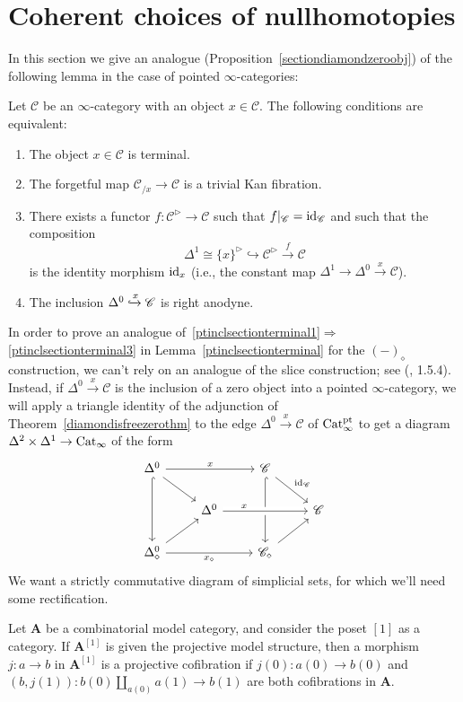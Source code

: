 \documentclass{tac}
\newcommand{\s}[1]{\mathscr{#1}}
\renewcommand{\bf}[1]{\mathbf{#1}}
\newcommand{\tx}[1]{\textnormal{#1}}
\begin{document}
\section{Coherent choices of nullhomotopies}
In this section we give an analogue (Proposition~\ref{sectiondiamondzeroobj}) of the following lemma in the case of pointed $\infty$-categories:
\begin{lemma}[\tx{}\cite{kerodon}, 02J5]\label{ptinclsectionterminal} Let $\s{C}$ be an $\infty$-category with an object $x\in \s{C}$.  The following conditions are equivalent:
\begin{enumerate}
\item\label{ptinclsectionterminal1} The object $x\in \s{C}$ is terminal.
\item\label{ptinclsectionterminal2} The forgetful map $\s{C}_{/x} \to \s{C}$ is a trivial Kan fibration.
\item\label{ptinclsectionterminal3} There exists a functor $f : \s{C}^\triangleright \to \s{C}$ such that $f|_{\s{C}} = \tx{id}_{\s{C}}$ and such that the composition
\[ \Delta^1 \cong \{ x\}^\triangleright \hookrightarrow  \s{C}^\triangleright \xrightarrow{f} \s{C} \]
is the identity morphism $\tx{id}_x$ (i.e., the constant map $\Delta^1 \to \Delta^0 \xrightarrow{x} \s{C}$).
\item\label{ptinclsectionterminal4} The inclusion $\Delta^0 \xhookrightarrow{x} \s{C}$ is right anodyne.
\end{enumerate}
\end{lemma}
In order to prove an analogue of~\ref{ptinclsectionterminal1}$\Rightarrow$\ref{ptinclsectionterminal3} in Lemma~\ref{ptinclsectionterminal} for the $(-)_\diamond$ construction, we can't rely on an analogue of the slice construction; see (\cite{thesis}, 1.5.4).  Instead, if $\Delta^0 \xrightarrow{x} \s{C}$ is the inclusion of a zero object into a pointed $\infty$-category, we will apply a triangle identity of the adjunction of Theorem~\ref{diamondisfreezerothm} to the edge $\Delta^0 \xrightarrow{x} \s{C}$ of $\tx{Cat}_\infty^\tx{pt}$ to get a diagram $\Delta^2 \times \Delta^1 \to \tx{Cat}_\infty$ of the form 
\[\begin{tikzcd}
 \Delta^0 \arrow[]{rr}{x} \arrow[]{dr} \arrow[hook]{dd} & & \s{C} \arrow[]{dr}{\tx{id}_{\s{C}}} \arrow[hook]{dd} & \\
 & \Delta^0 \arrow[crossing over]{rr}[near start]{x} & & \s{C} \\
\Delta^0_\diamond  \arrow[]{ur} \arrow[]{rr}[swap]{x_\diamond} & & \s{C}_\diamond \arrow[]{ur} &
\end{tikzcd}\]
We want a strictly commutative diagram of simplicial sets, for which we'll need some rectification.
\begin{lemma}[\tx{}\cite{thesis}, 1.5.2]\label{cofinprojmodelstr} Let $\bf{A}$ be a combinatorial model category, and consider the poset $[1]$ as a category.  If $\bf{A}^{[1]}$ is given the projective model structure, then a morphism $j : a\to b$ in $\bf{A}^{[1]}$ is a projective cofibration if $j(0) : a(0)\to b(0)$ and $(b, j(1)) : b(0)\coprod_{a(0)} a(1) \to b(1)$ are both cofibrations in $\bf{A}$.
\end{lemma}
\end{document}

